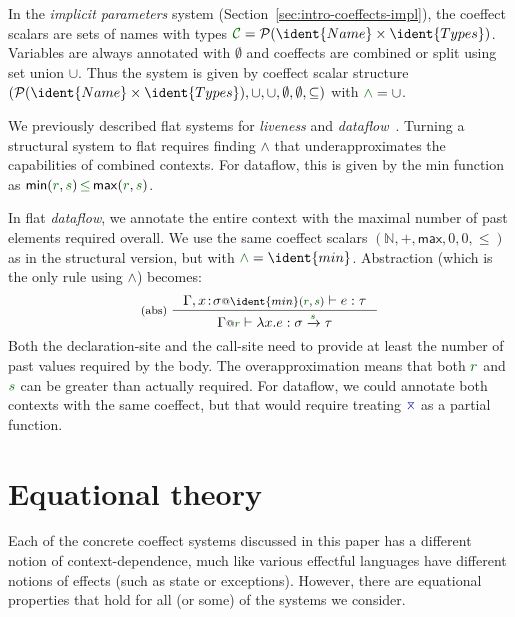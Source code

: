 In the \emph{implicit parameters} system (Section~\ref{sec:intro-coeffects-impl}), 
the co\-effect scalars are sets of names with types 
$\C = \mathcal{P}(\ident{Name} \times \ident{Types}) $. Variables
are always annotated with $\emptyset$ and coeffects are combined or split using set union $\cup$. Thus
the system is given by coeffect scalar structure $(\mathcal{P}(\ident{Name} \times \ident{Types}), \cup, \cup, \emptyset, \emptyset, \subseteq)$
with $\cclrd{\wedge} = \cup$.

\begin{remark}
We previously described flat systems for \emph{liveness} and \emph{dataflow}~\cite{petricek2013coeffects}.
Turning a structural system to flat requires finding $\wedge$ that 
underapproximates the capabilities of combined contexts. For dataflow, this is given by the \textsf{min} function as
$\mathsf{min}(\cclrd{r},\cclrd{s}) \,\cleq\, \mathsf{max}(\cclrd{r},\cclrd{s})$.

In flat \emph{dataflow}, we annotate the
entire context with the maximal number of past elements required
overall. We use the same coeffect scalars $(\mathbb{N}, +, \mathsf{max}, 0, 0, \leq)$
as in the structural version, but with
$\cclrd{\wedge} = \ident{min}$. Abstraction (which is the only rule using $\wedge$) becomes:
\[
\tyrule{abs}
  { \coctx{\Gamma, x\!:\!\sigma}{\ident{min}(\cclrd{r}, \cclrd{s})} \vdash e : \tau }
  { \coctx{\Gamma}{\cclrd{r}} \vdash \lambda x . e : \sigma \xrightarrow{\cclrd{s}} \tau }
\]
Both the declaration-site and the call-site need to provide at least
the number of past values required by the body. The overapproximation means that both $\cclrd{r}$
and $\cclrd{s}$ can be greater than actually required.
For dataflow, we could annotate
both contexts with the same coeffect,
but that would require treating $\amerge$ as a partial function.
\end{remark}


\section{Equational theory}
\label{sec:syntax}
\newcommand{\reduce}{\leadsto}

Each of the concrete coeffect systems discussed in this paper has a different notion of 
context-dependence, much like various effectful languages have different notions of effects
(such as state or exceptions). However, there are equational properties that hold for all (or some) of
the systems we consider.

